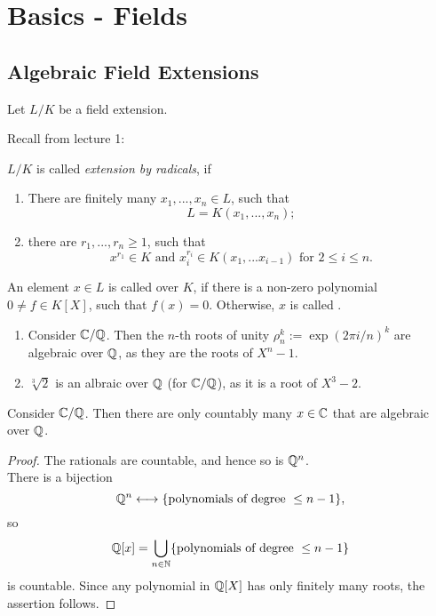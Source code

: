\chapter{Basics - Fields}
\section{Algebraic Field Extensions}
Let $L/K$ be a field extension. \par
Recall from lecture 1:
\begin{defn}
  $L/K$ is called \emph{extension by radicals}, if
  \begin{enumerate}
    \item There are finitely many $x_1,...,x_n\in L$, such that
    \[
    L=K(x_1,...,x_n);
    \]
    \item there are $r_1,...,r_n\geq 1$, such that
    \[
    x^{r_1}\in K\text{ and }x_i^{r_i}\in K(x_1,...x_{i-1})\text{ for }2\leq i\leq n.
    \]
  \end{enumerate}
\end{defn}
\begin{defn}
  An element $x\in L$ is called  over $K$, if there is a non-zero polynomial $0\neq f\in K[X]$, such that $f(x)=0$. Otherwise, $x$ is called .
\end{defn}
\begin{bsp}
  \begin{enumerate}
    \item Consider $\mathbb{C}/\mathbb{Q}$. Then the $n$-th roots of unity $\rho_n^k:=\exp(2\pi i/n)^k$ are algebraic over $\mathbb{Q}$, as they are the roots of $X^n-1$.
    \item $\sqrt[3]{2}$ is an albraic over $\mathbb{Q}$ (for $\mathbb{C}/\mathbb{Q}$), as it is a root of $X^3-2$.
  \end{enumerate}
\end{bsp}
\begin{prop}
  Consider $\mathbb{C}/\mathbb{Q}$. Then there are only countably many $x\in \mathbb{C}$ that are algebraic over $\mathbb{Q}$.
\end{prop}
\begin{proof}
  The rationals are countable, and hence so is $\mathbb{Q}^n$.\\
  There is a bijection
  \[
  \mathbb{Q}^n \longleftrightarrow \{\text{polynomials of degree }\leq n-1\},
  \]
  so
  \[
  \mathbb{Q}[x]=\bigcup_{n\in \mathbb{N}} \{\text{polynomials of degree }\leq n-1\}
  \]
  is countable. Since any polynomial in $\mathbb{Q}[X]$ has only finitely many roots, the assertion follows.
\end{proof}
